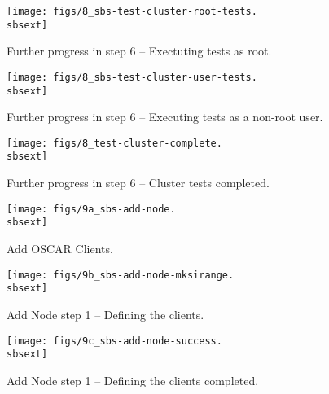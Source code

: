 \begin{figure}[htbp]
  \begin{center}
    \centerline{\texttt{[image: figs/8\_sbs-test-cluster-root-tests.\\sbsext]}}
    \caption{Further progress in step 6 -- Exectuting tests as root.}
    \label{fig:sbs-setup-test}
  \end{center}
\end{figure}

\begin{figure}[htbp]
  \begin{center}
    \centerline{\texttt{[image: figs/8\_sbs-test-cluster-user-tests.\\sbsext]}}
    \caption{Further progress in step 6 -- Executing tests as a non-root user.}
    \label{fig:sbs-setup-test1}
  \end{center}
\end{figure}


\begin{figure}[htbp]
  \begin{center}
    \centerline{\texttt{[image: figs/8\_test-cluster-complete.\\sbsext]}}
    \caption{Further progress in step 6 -- Cluster tests completed.}
    \label{fig:sbs-setup-test2}
  \end{center}
\end{figure}


\begin{figure}[htbp]
  \begin{center}
    \centerline{\texttt{[image: figs/9a\_sbs-add-node.\\sbsext]}}
    \caption{Add OSCAR Clients.}
    \label{fig:sbs-add-node1}
  \end{center}
\end{figure}


\begin{figure}[htbp]
  \begin{center}
    \centerline{\texttt{[image: figs/9b\_sbs-add-node-mksirange.\\sbsext]}}
    \caption{Add Node step 1 -- Defining the clients.}
    \label{fig:sbs-add-node1-define-clients}
  \end{center}
\end{figure}

\begin{figure}[htbp]
  \begin{center}
    \centerline{\texttt{[image: figs/9c\_sbs-add-node-success.\\sbsext]}}
    \caption{Add Node step 1 -- Defining the clients completed.}
    \label{fig:sbs-add-node1-define-clients2}
  \end{center}
\end{figure}


